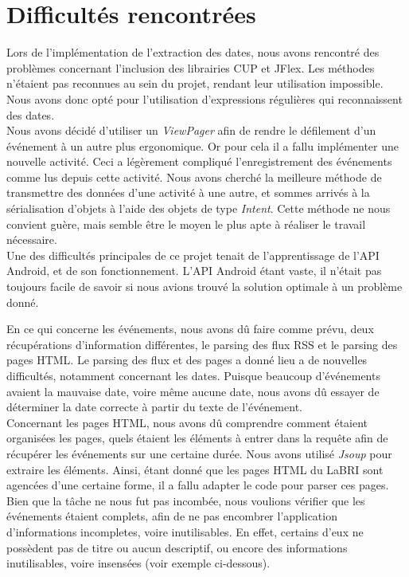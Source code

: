\chapter{Difficultés rencontrées}

Lors de l’implémentation de l’extraction des dates, nous avons rencontré des problèmes concernant l’inclusion des librairies CUP et JFlex. Les méthodes n’étaient pas reconnues au sein du projet, rendant leur utilisation impossible.
Nous avons donc opté pour l'utilisation d'expressions régulières qui reconnaissent des dates. \\

Nous avons décidé d'utiliser un \emph{ViewPager} afin de rendre le défilement d’un événement à un autre plus ergonomique. Or pour cela il a fallu implémenter une nouvelle activité. Ceci a légèrement compliqué l'enregistrement des événements comme lus depuis cette activité. Nous avons cherché la meilleure méthode de transmettre des données d’une activité à une autre, et sommes arrivés à la sérialisation d’objets à l'aide des objets de type \emph{Intent}. Cette méthode ne nous convient guère, mais semble être le moyen le plus apte à réaliser le travail nécessaire. \\

Une des difficultés principales de ce projet tenait de l’apprentissage de l’API Android, et de son fonctionnement. L’API Android étant vaste, il n’était pas toujours facile de savoir si nous avions trouvé la solution optimale à un problème donné.

En ce qui concerne les événements, nous avons dû faire comme prévu, deux récupérations d’information différentes, le parsing des flux RSS et le parsing des pages HTML.
Le parsing des flux et des pages a donné lieu a de nouvelles difficultés, notamment concernant les dates. Puisque beaucoup d'événements avaient la mauvaise date, voire même aucune date, nous avons dû essayer de déterminer la date correcte à partir du texte de l'événement. \\


Concernant les pages HTML, nous avons dû comprendre comment étaient organisées les pages, quels étaient les éléments à entrer dans la requête afin de récupérer les événements sur une certaine durée. Nous avons utilisé \emph{Jsoup} pour extraire les éléments. Ainsi, étant donné que les pages HTML du LaBRI sont agencées d'une certaine forme, il a fallu adapter le code pour parser ces pages.
Bien que la tâche ne nous fut pas incombée, nous voulions vérifier que les événements étaient complets, afin de ne pas encombrer l'application d'informations incompletes, voire inutilisables. En effet, certains d’eux ne possèdent pas de titre ou aucun descriptif, ou encore des informations inutilisables, voire insensées (voir exemple ci-dessous).

